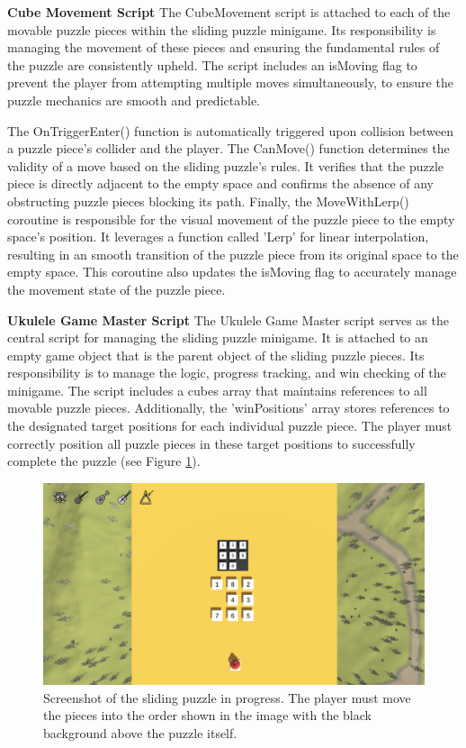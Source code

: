\documentclass{l4proj}
\begin{document}
\textbf{Cube Movement Script} \newline
The CubeMovement script is attached to each of the movable puzzle pieces within the sliding puzzle minigame. Its responsibility is managing the movement of these pieces and ensuring the fundamental rules of the puzzle are consistently upheld. The script includes an isMoving flag to prevent the player from attempting multiple moves simultaneously, to ensure the puzzle mechanics are smooth and predictable.

The OnTriggerEnter() function is automatically triggered upon collision between a puzzle piece's collider and the player. The CanMove() function determines the validity of a move based on the sliding puzzle's rules. It verifies that the puzzle piece is directly adjacent to the empty space and confirms the absence of any obstructing puzzle pieces blocking its path. Finally, the MoveWithLerp() coroutine is responsible for the visual movement of the puzzle piece to the empty space's position. It leverages a function called 'Lerp' for linear interpolation, resulting in an smooth transition of the puzzle piece from its original space to the empty space. This coroutine also updates the isMoving flag to accurately manage the movement state of the puzzle piece.

\textbf{Ukulele Game Master Script} \newline
The Ukulele Game Master script serves as the central script for managing the sliding puzzle minigame. It is attached to an empty game object that is the parent object of the sliding puzzle pieces. Its responsibility is to manage the logic, progress tracking, and win checking of the minigame. The script includes a cubes array that maintains references to all movable puzzle pieces. Additionally, the 'winPositions' array stores references to the designated target positions for each individual puzzle piece.  The player must correctly position all puzzle pieces in these target positions to successfully complete the puzzle (see Figure \ref{fig:puzzle_incomplete}).

\begin{figure}[h]
  \centering
  \includegraphics[width=0.7\linewidth]{dissertation/images/Sliding_Incomplete.png} 
  \caption{Screenshot of the sliding puzzle in progress. The player must move the pieces into the order shown in the image with the black background above the puzzle itself.} 
  \label{fig:puzzle_incomplete} 
\end{figure}
\end{document}
